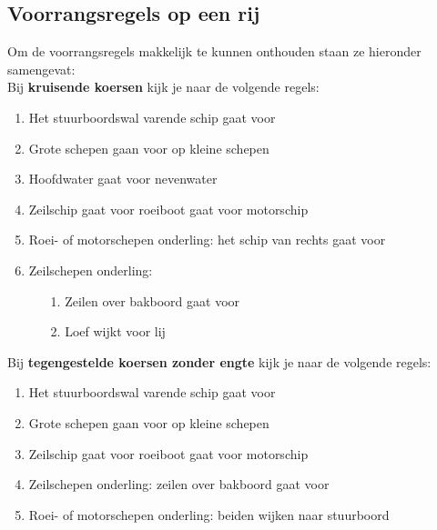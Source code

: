 \subsection{Voorrangsregels op een rij}
Om de voorrangsregels makkelijk te kunnen onthouden staan ze hieronder samengevat:\\[0.1cm]
Bij \textbf{kruisende koersen} kijk je naar de volgende regels:
\vspace*{-0.15cm}
\begin{enumerate}
    \item Het stuurboordswal varende schip gaat voor
    \item Grote schepen gaan voor op kleine schepen
    \item Hoofdwater gaat voor nevenwater
    \item Zeilschip gaat voor roeiboot gaat voor motorschip
    \item Roei- of motorschepen onderling: het schip van rechts gaat voor
    \item Zeilschepen onderling: 
        \begin{enumerate}
	            \item [1.]Zeilen over bakboord gaat voor
	            \item [2.]Loef wijkt voor lij
	        \end{enumerate}
\end{enumerate}

Bij \textbf{tegengestelde koersen zonder engte} kijk je naar de volgende regels:
\vspace*{-0.15cm}
\begin{enumerate}
    \item Het stuurboordswal varende schip gaat voor
    \item Grote schepen gaan voor op kleine schepen
    \item Zeilschip gaat voor roeiboot gaat voor motorschip
    \item Zeilschepen onderling: zeilen over bakboord gaat voor
    \item Roei- of motorschepen onderling: beiden wijken naar stuurboord
\end{enumerate}


